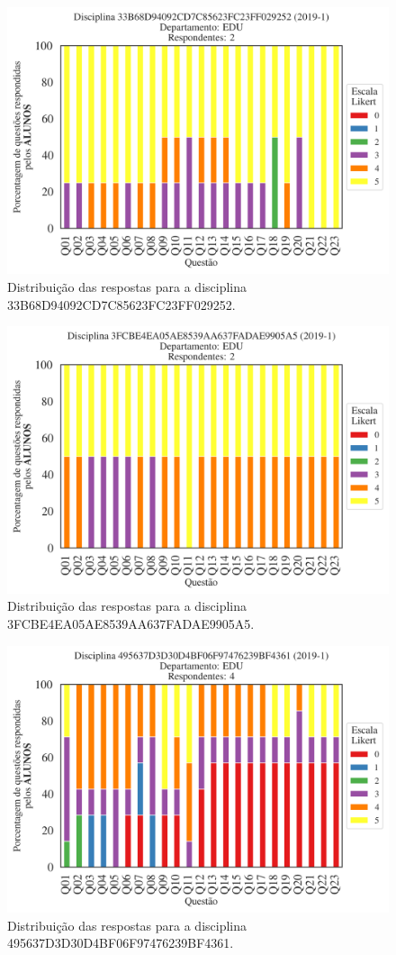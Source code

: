 \documentclass[a4paper,10pt]{article}
\begin{document}
\begin{figure}[h]
\centering
\includegraphics[width=0.485\linewidth]{analise_disciplina_departamento_EDU_ALUNO_TURMA_33B68D94092CD7C85623FC23FF029252.png}
\caption{\label{fig:analise_geral_departamento}                Distribuição das respostas para a disciplina 33B68D94092CD7C85623FC23FF029252.}
\end{figure}
\begin{figure}[h]
\centering
\includegraphics[width=0.485\linewidth]{analise_disciplina_departamento_EDU_ALUNO_TURMA_3FCBE4EA05AE8539AA637FADAE9905A5.png}
\caption{\label{fig:analise_geral_departamento}                Distribuição das respostas para a disciplina 3FCBE4EA05AE8539AA637FADAE9905A5.}
\end{figure}
\begin{figure}[h]
\centering
\includegraphics[width=0.485\linewidth]{analise_disciplina_departamento_EDU_ALUNO_TURMA_495637D3D30D4BF06F97476239BF4361.png}
\caption{\label{fig:analise_geral_departamento}                Distribuição das respostas para a disciplina 495637D3D30D4BF06F97476239BF4361.}
\end{figure}
\end{document}
